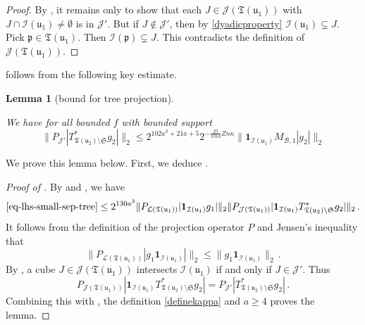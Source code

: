 \documentclass[10pt,a4paper]{article}
\theoremstyle{plain}
\newtheorem{lemma}[theorem]{Lemma}
\theoremstyle{definition}
\numberwithin{equation}{subsection}
\newcommand{\fp}{{\mathfrak p}}
\newcommand{\fu}{{\mathfrak u}}
\newcommand{\fT}{{\mathfrak T}}
\newcommand{\scI}{{\mathcal{I}}} %
\newcommand{\lean}[1]{}
\newcommand{\proves}[1]{}
\newcommand{\uses}[1]{}
\newcommand{\leanok}{}
\begin{document}
    \begin{proof}\leanok
        By , it remains only to show that each $J \in \mathcal{J}(\fT(\fu_1))$ with $J \cap \scI(\fu_1) \ne \emptyset$ is in $\mathcal{J}'$. But if $J \notin \mathcal{J}'$, then by \eqref{dyadicproperty} $\scI(\fu_1) \subsetneq J$. Pick $\fp \in \fT(\fu_1)$. Then $\scI(\fp) \subsetneq J$. This contradicts the definition of $\mathcal{J}(\fT(\fu_1))$.
    \end{proof}

     follows from the following key estimate.

    \begin{lemma}[bound for tree projection]
        \label{bound-for-tree-projection}
        \leanok
        \lean{TileStructure.Forest.bound_for_tree_projection}
        \uses{adjoint-tile-support,overlap-implies-distance,dyadic-partition-2,thin-scale-impact,square-function-count}
        We have for all bounded $f$ with bounded support
        $$
            \|P_{\mathcal{J}'}|T_{\fT(\fu_2) \setminus \mathfrak{S}}^* g_2|\|_2
            \le 2^{102a^3+21a+5} 2^{-\frac{25}{101a}Zn\kappa} \|\mathbf{1}_{\scI(\fu_1)} M_{\mathcal{B},1} |g_2|\|_2
        $$
    \end{lemma}

    We prove this lemma below. First, we deduce .

    \begin{proof}[Proof of ]
        \leanok
        \proves{correlation-near-tree-parts}
        By  and , we have
        \begin{align*}
            \eqref{eq-lhs-small-sep-tree} \le 2^{130a^3} \|P_{\mathcal{L}(\fT(\fu_1))} |\mathbf{1}_{\scI(\fu_1)}g_1| \|_2 \|P_{\mathcal{J}(\fT(\fu_1) )}|\mathbf{1}_{\scI(\fu_1)} T_{\fT(\fu_2) \setminus \mathfrak{S}}^* g_2|\|_2\,.
        \end{align*}
        It follows from the definition of the projection operator $P$ and Jensen's inequality that
        $$
            \|P_{\mathcal{L}(\fT(\fu_1))} |g_1\mathbf{1}_{\scI(\fu_1)}| \|_2 \le \|g_1 \mathbf{1}_{\scI(\fu_1)}\|_2\,.
        $$
        By , a cube $J \in \mathcal{J}(\fT(\fu_1))$ intersects $\scI(\fu_1)$ if and only if $J \in \mathcal{J}'$. Thus
        $$
            P_{\mathcal{J}(\fT(\fu_1) )}|\mathbf{1}_{\scI(\fu_1)} T_{\fT(\fu_2) \setminus \mathfrak{S}}^* g_2| = P_{\mathcal{J}'}|T_{\fT(\fu_2) \setminus \mathfrak{S}}^* g_2|\,.
        $$
        Combining this with , the definition \eqref{definekappa} and $a \ge 4$ proves the lemma.
    \end{proof}
\end{document}
